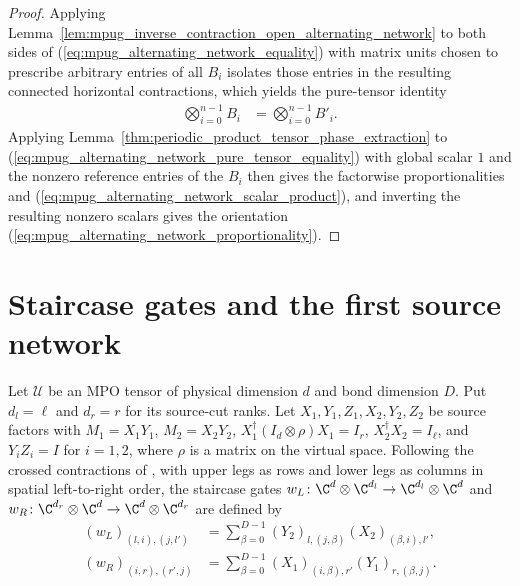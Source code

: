 \begin{proof}\leanok
    Applying Lemma~\ref{lem:mpug_inverse_contraction_open_alternating_network}
    to both sides of (\ref{eq:mpug_alternating_network_equality}) with matrix
    units chosen to prescribe arbitrary entries of all $B_i$ isolates those
    entries in the resulting connected horizontal contractions, which yields
    the pure-tensor identity
    \begin{align}
        \bigotimes_{i=0}^{n-1}B_i
         & =\bigotimes_{i=0}^{n-1}B'_i.
        \label{eq:mpug_alternating_network_pure_tensor_equality}
    \end{align}
    Applying Lemma~\ref{thm:periodic_product_tensor_phase_extraction} to
    (\ref{eq:mpug_alternating_network_pure_tensor_equality}) with global scalar
    $1$ and the nonzero reference entries of the $B_i$ then gives the
    factorwise proportionalities and
    (\ref{eq:mpug_alternating_network_scalar_product}), and inverting the
    resulting nonzero scalars gives the orientation
    (\ref{eq:mpug_alternating_network_proportionality}).
\end{proof}

\section{Staircase gates and the first source network}
\label{sec:mpug_staircase_gates}

\begin{definition}
    \label{def:mpug_staircase_gates}
    \leanok
    Let $\mathcal U$ be an MPO tensor of physical dimension $d$ and bond
    dimension $D$. Put $d_l=\ell$ and $d_r=r$ for its source-cut ranks.
    Let $X_1,Y_1,Z_1,X_2,Y_2,Z_2$ be source factors with
    $M_1=X_1Y_1$, $M_2=X_2Y_2$,
    $X_1^\dagger(I_d\otimes\rho)X_1=I_r$,
    $X_2^\dagger X_2=I_\ell$, and $Y_iZ_i=I$ for $i=1,2$,
    where $\rho$ is a matrix on the virtual space. Following the crossed
    contractions of \cite[lines~811--869]{FrancoRubio2025MPUGauging}, with
    upper legs as rows and lower legs as columns in spatial left-to-right
    order, the staircase gates
    $w_L\colon\C^d\otimes\C^{d_l}\to\C^{d_l}\otimes\C^d$ and
    $w_R\colon\C^{d_r}\otimes\C^d\to\C^d\otimes\C^{d_r}$ are defined by
    \begin{align}
        (w_L)_{(l,i),(j,l')}
         & =\sum_{\beta=0}^{D-1} (Y_2)_{l,(j,\beta)}
        (X_2)_{(\beta,i),l'},                         \\
        (w_R)_{(i,r),(r',j)}
         & =\sum_{\beta=0}^{D-1} (X_1)_{(i,\beta),r'}
        (Y_1)_{r,(\beta,j)}.
    \end{align}
\end{definition}

